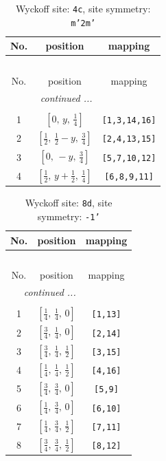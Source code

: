 \documentclass[fleqn,8pt]{jsarticle}
\begin{document}
\renewcommand{\arraystretch}{1.2}
\begin{longtable}{ccc}
\caption{Wyckoff site: {\tt 4c}, site symmetry: {\tt m'2m'}}
 \\
 \hline \hline
No. & position & mapping \\ \hline \endfirsthead

\multicolumn{2}{l}{\tablename\ \thetable{}} \\
 \hline \hline
No. & position & mapping \\ \hline \endhead

 \hline \hline
\multicolumn{2}{r}{\footnotesize\it continued ...} \\ \endfoot

 \hline \hline
\multicolumn{2}{r}{} \\ \endlastfoot

1 & $\left[ 0,\, y,\, \frac{1}{4} \right]$ & {\tt [1,3,14,16]} \\ \hline
2 & $\left[ \frac{1}{2},\, \frac{1}{2} - y,\, \frac{3}{4} \right]$ & {\tt [2,4,13,15]} \\ \hline
3 & $\left[ 0,\, - y,\, \frac{3}{4} \right]$ & {\tt [5,7,10,12]} \\ \hline
4 & $\left[ \frac{1}{2},\, y + \frac{1}{2},\, \frac{1}{4} \right]$ & {\tt [6,8,9,11]} \\
\end{longtable}
\renewcommand{\arraystretch}{1.2}
\begin{longtable}{ccc}
\caption{Wyckoff site: {\tt 8d}, site symmetry: {\tt -1'}}
 \\
 \hline \hline
No. & position & mapping \\ \hline \endfirsthead

\multicolumn{2}{l}{\tablename\ \thetable{}} \\
 \hline \hline
No. & position & mapping \\ \hline \endhead

 \hline \hline
\multicolumn{2}{r}{\footnotesize\it continued ...} \\ \endfoot

 \hline \hline
\multicolumn{2}{r}{} \\ \endlastfoot

1 & $\left[ \frac{1}{4},\, \frac{1}{4},\, 0 \right]$ & {\tt [1,13]} \\ \hline
2 & $\left[ \frac{3}{4},\, \frac{1}{4},\, 0 \right]$ & {\tt [2,14]} \\ \hline
3 & $\left[ \frac{3}{4},\, \frac{1}{4},\, \frac{1}{2} \right]$ & {\tt [3,15]} \\ \hline
4 & $\left[ \frac{1}{4},\, \frac{1}{4},\, \frac{1}{2} \right]$ & {\tt [4,16]} \\ \hline
5 & $\left[ \frac{3}{4},\, \frac{3}{4},\, 0 \right]$ & {\tt [5,9]} \\ \hline
6 & $\left[ \frac{1}{4},\, \frac{3}{4},\, 0 \right]$ & {\tt [6,10]} \\ \hline
7 & $\left[ \frac{1}{4},\, \frac{3}{4},\, \frac{1}{2} \right]$ & {\tt [7,11]} \\ \hline
8 & $\left[ \frac{3}{4},\, \frac{3}{4},\, \frac{1}{2} \right]$ & {\tt [8,12]} \\
\end{longtable}
\end{document}
